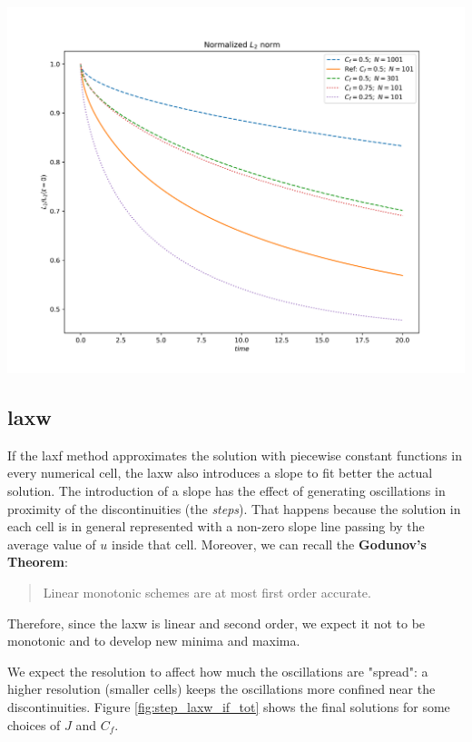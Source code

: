 \documentclass[11pt, a4paper]{article}
\begin{document}
\begin{center}
    \centering
    \includegraphics[width=0.9\linewidth]{images/L2_STEP_LAX-F.png}
    \label{fig:step_laxf_l2_tot}
\end{center}

\subsection{\acrlong{laxw}}

If the \acrshort{laxf} method approximates the solution with piecewise constant functions in every numerical cell, the \acrshort{laxw} also introduces a slope to fit better the actual solution. The introduction of a slope has the effect of generating oscillations in proximity of the discontinuities (the \textit{steps}). That happens because the solution in each cell is in general represented with a non-zero slope line passing by the average value of \(u\) inside that cell. Moreover, we can recall the \textbf{Godunov's Theorem}:

\begin{quote}
    Linear monotonic schemes are at most first order accurate.
\end{quote}

\noindent
Therefore, since the \acrshort{laxw} is linear and second order, we expect it not to be monotonic and to develop new minima and maxima.

We expect the resolution to affect how much the oscillations are "spread": a higher resolution (smaller cells) keeps the oscillations more confined near the discontinuities. Figure \ref{fig:step_laxw_if_tot} shows the final solutions for some choices of \(J\) and \(C_f\).
\end{document}
